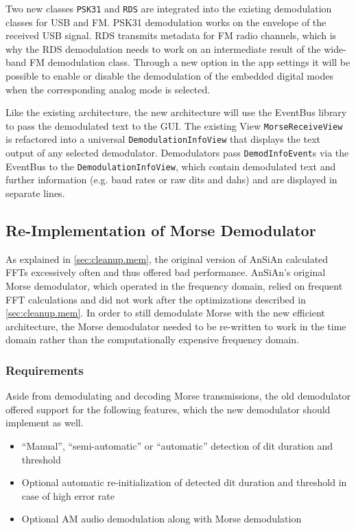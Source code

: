 Two new classes \texttt{PSK31} and \texttt{RDS} are integrated into the
existing demodulation classes for \ac{USB} and \ac{FM}. \ac{PSK31} demodulation
works on the envelope of the received \ac{USB} signal.  \ac{RDS} transmits
metadata for \ac{FM} radio channels, which is why the \ac{RDS} demodulation
needs to work on an intermediate result of the wide-band \ac{FM} demodulation
class. Through a new option in the app settings it will be possible to enable
or disable the demodulation of the embedded digital modes when the
corresponding analog mode is selected.

Like the existing architecture, the new architecture will use the EventBus
library to pass the demodulated text to the \ac{GUI}. The existing View
\texttt{MorseReceiveView} is refactored into a universal
\texttt{De\-mo\-du\-la\-tion\-In\-fo\-View} that displays the text output of any selected 
demodulator. Demodulators pass
\texttt{DemodInfoEvent}s via the EventBus to the \texttt{De\-mo\-du\-la\-tion\-In\-fo\-View}, 
which contain demodulated text and further information (e.g. baud rates or raw 
dits and dahs) and are displayed in separate lines.

\subsection{Re-Implementation of Morse Demodulator\label{sec:morse_demod}}

As explained in \autoref{sec:cleanup.mem}, the original version of \ac{AnSiAn} calculated \acp{FFT} excessively often and thus offered bad performance. \ac{AnSiAn}'s original Morse demodulator, which operated in the frequency domain, relied on frequent \ac{FFT} calculations and did not work after the optimizations described in \autoref{sec:cleanup.mem}. In order to still demodulate Morse with the new efficient architecture, the Morse demodulator needed to be re-written to work in the time domain rather than the computationally expensive frequency domain.

\subsubsection{Requirements}

Aside from demodulating and decoding Morse transmissions, the old demodulator offered support for the following features, which the new demodulator should implement as well.

\begin{itemize}
  \item ``Manual'', ``semi-automatic'' or ``automatic'' detection of dit duration and threshold
  \item Optional automatic re-initialization of detected dit duration and threshold in case of high error rate
  \item Optional \ac{AM} audio demodulation along with Morse demodulation
\end{itemize}

